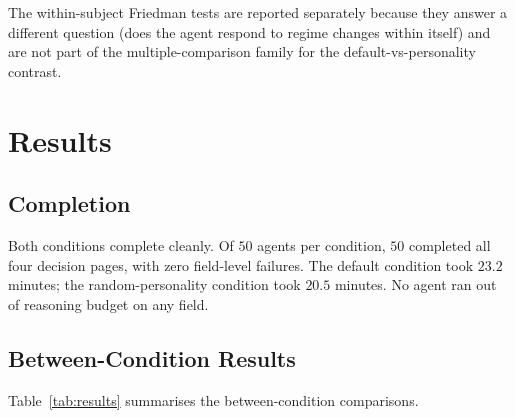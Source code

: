 \documentclass[12pt, a4paper]{article}
\begin{document}
The within-subject Friedman tests are reported separately because they answer a different question (does the agent respond to regime changes within itself) and are not part of the multiple-comparison family for the default-vs-personality contrast.

\section{Results}

\subsection{Completion}

Both conditions complete cleanly. Of $50$ agents per condition, $50$ completed all four decision pages, with zero field-level failures. The default condition took $23.2$ minutes; the random-personality condition took $20.5$ minutes. No agent ran out of reasoning budget on any field.

\subsection{Between-Condition Results}

Table~\ref{tab:results} summarises the between-condition comparisons.
\end{document}
